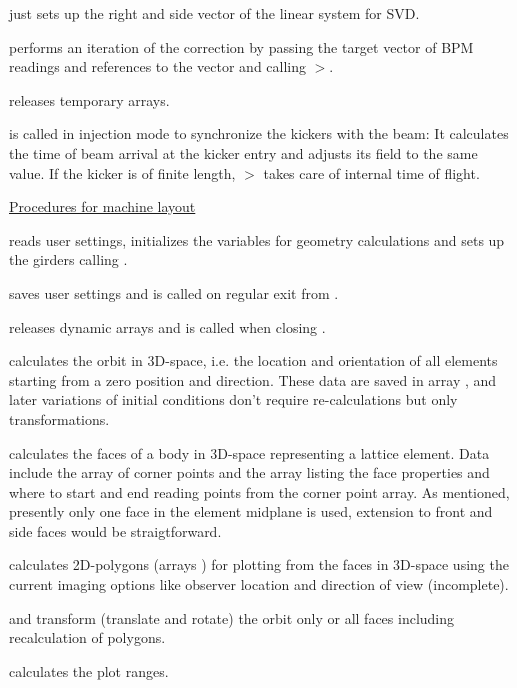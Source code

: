 \documentclass[12pt]{article}
\newcommand\code[1]{{\tt #1}}
\newcommand{\unico}[1]{{\color{burntorange}\code{#1}}}
\newcommand{\prcod}[2]{\opauni{#1}$>$\unico{#2}}
\newcommand{\opagui}[1]{\colorbox{blue!20}{{\color{black}\code{#1}}}}
\newcommand{\ogui}[1]{\hyperref[#1]{\opagui{#1}}}
\newcommand{\opauni}[1]{\colorbox{orange!30}{{\color{black}\code{#1}}}}
\newcommand{\todo}[1]{{\color{red} #1}}
\begin{document}
\unico{oco\_init} just sets up the right and side vector of the linear system for SVD.

\unico{oco\_step} performs an iteration of the correction by passing the target vector of BPM readings and references to the vector and calling \prcod{mathlib}{SVBKSB}.

\unico{oco\_term} releases temporary arrays.

\unico{SyncKickers} is called in injection mode to synchronize the kickers with the beam: It calculates the time of beam arrival at the kicker entry and adjusts its field \unico{delay} to the same value. If the kicker is of finite length, \prcod{elemlib}{Kicker} takes care of internal time of flight.

\underline{Procedures for machine layout}

\unico{GeoInit} reads user settings, initializes the variables for geometry calculations and sets up the girders calling \unico{GirderSetup}.

\unico{GeoExit} saves user settings and is called on regular exit from \ogui{opageometry}.

\unico{GeoClose} releases dynamic arrays and is called when closing \ogui{opageometry}.

\unico{CalcOrbit} calculates the orbit in 3D-space, i.e. the location and orientation of all elements starting from a zero position and direction. These data are saved in array \unico{midpt}, and later variations of initial conditions don't require re-calculations but only transformations. 
 
\unico{CalcFaces} calculates the faces of a body in 3D-space representing a lattice element. Data include the array \unico{vpt} of corner points and the array \unico{face} listing the face properties and where to start and end reading points from the corner point array. \todo{As mentioned, presently only one face in the element midplane is used, extension to front and side faces would be straigtforward.}

\unico{CalcPoly} calculates 2D-polygons (arrays \unico{ptx,pty}) for plotting from the faces in 3D-space using the current imaging options like observer location and direction of view \todo{(incomplete)}.

\unico{TransRot} and \unico{TransPoly} transform (translate and rotate) the orbit only or all faces including recalculation of polygons.
                 
\unico{geoMinMax}  calculates the plot ranges.
\end{document}
